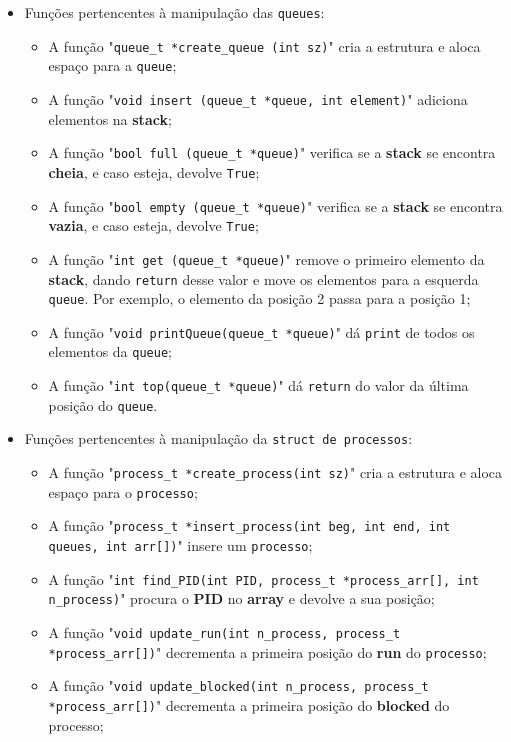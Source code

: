\documentclass[11pt]{article}   %
\begin{document}
\begin{itemize}
    \item Funções pertencentes à manipulação das \verb|queues|:
        \begin{itemize}
            \item A função "\verb|queue_t *create_queue (int sz)|" cria a estrutura e aloca espaço para a \verb|queue|;
            \item A função "\verb|void insert (queue_t *queue, int element)|" adiciona elementos na \textbf{stack};
            \item A função "\verb|bool full (queue_t *queue)|" verifica se a \textbf{stack} se encontra \textbf{cheia}, e caso esteja, devolve \verb|True|;
            \item A função "\verb|bool empty (queue_t *queue)|" verifica se a \textbf{stack} se encontra \textbf{vazia}, e caso esteja, devolve \verb|True|;
            \item A função "\verb|int get (queue_t *queue)|" remove o primeiro elemento da \textbf{stack}, dando \verb|return| desse valor e move os elementos para a esquerda \verb|queue|. Por exemplo, o elemento da posição 2 passa para a posição 1;
            \item A função "\verb|void printQueue(queue_t *queue)|" dá \verb|print| de todos os elementos da \verb|queue|;
            \item A função "\verb|int top(queue_t *queue)|" dá \verb|return| do valor da última posição do \verb|queue|.
        \end{itemize}
    \newpage
    \item Funções pertencentes à manipulação da \verb|struct de processos|:
        \begin{itemize}
            \item A função "\verb|process_t *create_process(int sz)|" cria a estrutura e aloca espaço para o \verb|processo|;
            \item A função "\verb|process_t *insert_process(int beg, int end, int queues, int arr[])|" \newline insere um \verb|processo|;
            \item A função "\verb|int find_PID(int PID, process_t *process_arr[], int n_process)|" procura o \textbf{PID} no \textbf{array} e devolve a sua posição;
            \item A função "\verb|void update_run(int n_process, process_t *process_arr[])|" decrementa a primeira posição do \textbf{run} do \verb|processo|;
            \item A função "\verb|void update_blocked(int n_process, process_t *process_arr[])|" decrementa a primeira posição do \textbf{blocked} do processo;

\end{itemize}
\end{itemize}
\end{document}
